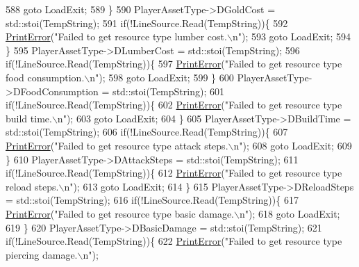 \begin{DoxyCode}
{588             \textcolor{keywordflow}{goto} LoadExit;
589         \}
590         PlayerAssetType->DGoldCost = std::stoi(TempString);
591         \textcolor{keywordflow}{if}(!LineSource.Read(TempString))\{
592             \hyperlink{Debug_8h_a2ed825eefefe35baf59a93a8c641323d}{PrintError}(\textcolor{stringliteral}{"Failed to get resource type lumber cost.\(\backslash\)n"});
593             \textcolor{keywordflow}{goto} LoadExit;
594         \}
595         PlayerAssetType->DLumberCost = std::stoi(TempString);
596         \textcolor{keywordflow}{if}(!LineSource.Read(TempString))\{
597             \hyperlink{Debug_8h_a2ed825eefefe35baf59a93a8c641323d}{PrintError}(\textcolor{stringliteral}{"Failed to get resource type food consumption.\(\backslash\)n"});
598             \textcolor{keywordflow}{goto} LoadExit;
599         \}
600         PlayerAssetType->DFoodConsumption = std::stoi(TempString);
601         \textcolor{keywordflow}{if}(!LineSource.Read(TempString))\{
602             \hyperlink{Debug_8h_a2ed825eefefe35baf59a93a8c641323d}{PrintError}(\textcolor{stringliteral}{"Failed to get resource type build time.\(\backslash\)n"});
603             \textcolor{keywordflow}{goto} LoadExit;
604         \}
605         PlayerAssetType->DBuildTime = std::stoi(TempString);
606         \textcolor{keywordflow}{if}(!LineSource.Read(TempString))\{
607             \hyperlink{Debug_8h_a2ed825eefefe35baf59a93a8c641323d}{PrintError}(\textcolor{stringliteral}{"Failed to get resource type attack steps.\(\backslash\)n"});
608             \textcolor{keywordflow}{goto} LoadExit;
609         \}
610         PlayerAssetType->DAttackSteps = std::stoi(TempString);
611         \textcolor{keywordflow}{if}(!LineSource.Read(TempString))\{
612             \hyperlink{Debug_8h_a2ed825eefefe35baf59a93a8c641323d}{PrintError}(\textcolor{stringliteral}{"Failed to get resource type reload steps.\(\backslash\)n"});
613             \textcolor{keywordflow}{goto} LoadExit;
614         \}
615         PlayerAssetType->DReloadSteps = std::stoi(TempString);
616         \textcolor{keywordflow}{if}(!LineSource.Read(TempString))\{
617             \hyperlink{Debug_8h_a2ed825eefefe35baf59a93a8c641323d}{PrintError}(\textcolor{stringliteral}{"Failed to get resource type basic damage.\(\backslash\)n"});
618             \textcolor{keywordflow}{goto} LoadExit;
619         \}
620         PlayerAssetType->DBasicDamage = std::stoi(TempString);
621         \textcolor{keywordflow}{if}(!LineSource.Read(TempString))\{
622             \hyperlink{Debug_8h_a2ed825eefefe35baf59a93a8c641323d}{PrintError}(\textcolor{stringliteral}{"Failed to get resource type piercing damage.\(\backslash\)n"});
}
\end{DoxyCode}
